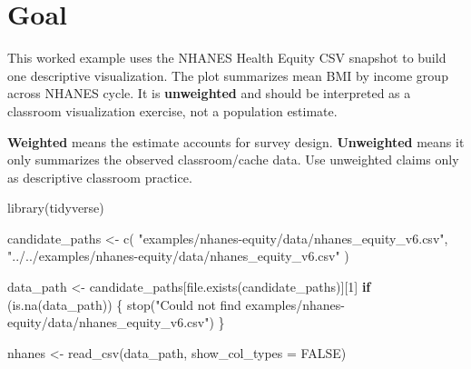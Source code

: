 \documentclass[
  letterpaper,
  DIV=11,
  numbers=noendperiod,
  oneside]{scrreprt}
\newenvironment{Shaded}{\begin{snugshade}}{\end{snugshade}}
\newcommand{\AttributeTok}[1]{\textcolor[rgb]{0.40,0.45,0.13}{#1}}
\newcommand{\ConstantTok}[1]{\textcolor[rgb]{0.56,0.35,0.01}{#1}}
\newcommand{\ControlFlowTok}[1]{\textcolor[rgb]{0.00,0.23,0.31}{\textbf{#1}}}
\newcommand{\DecValTok}[1]{\textcolor[rgb]{0.68,0.00,0.00}{#1}}
\newcommand{\FunctionTok}[1]{\textcolor[rgb]{0.28,0.35,0.67}{#1}}
\newcommand{\NormalTok}[1]{\textcolor[rgb]{0.00,0.23,0.31}{#1}}
\newcommand{\OtherTok}[1]{\textcolor[rgb]{0.00,0.23,0.31}{#1}}
\newcommand{\StringTok}[1]{\textcolor[rgb]{0.13,0.47,0.30}{#1}}
\begin{document}
\section*{Goal}\label{goal-2}


This worked example uses the NHANES Health Equity CSV snapshot to build
one descriptive visualization. The plot summarizes mean BMI by income
group across NHANES cycle. It is \textbf{unweighted} and should be
interpreted as a classroom visualization exercise, not a population
estimate.

\begin{tcolorbox}[enhanced jigsaw, title=\textcolor{quarto-callout-note-color}{\faInfo}\hspace{0.5em}{Definition: weighted vs unweighted}, arc=.35mm, toptitle=1mm, colframe=quarto-callout-note-color-frame, toprule=.15mm, leftrule=.75mm, bottomtitle=1mm, opacityback=0, bottomrule=.15mm, coltitle=black, breakable, opacitybacktitle=0.6, titlerule=0mm, colback=white, left=2mm, colbacktitle=quarto-callout-note-color!10!white, rightrule=.15mm]

\textbf{Weighted} means the estimate accounts for survey design.
\textbf{Unweighted} means it only summarizes the observed
classroom/cache data. Use unweighted claims only as descriptive
classroom practice.

\end{tcolorbox}

\begin{Shaded}
\begin{Highlighting}[numbers=left,,]
\FunctionTok{library}\NormalTok{(tidyverse)}

\NormalTok{candidate\_paths }\OtherTok{\textless{}{-}} \FunctionTok{c}\NormalTok{(}
  \StringTok{"examples/nhanes{-}equity/data/nhanes\_equity\_v6.csv"}\NormalTok{,}
  \StringTok{"../../examples/nhanes{-}equity/data/nhanes\_equity\_v6.csv"}
\NormalTok{)}

\NormalTok{data\_path }\OtherTok{\textless{}{-}}\NormalTok{ candidate\_paths[}\FunctionTok{file.exists}\NormalTok{(candidate\_paths)][}\DecValTok{1}\NormalTok{]}
\ControlFlowTok{if}\NormalTok{ (}\FunctionTok{is.na}\NormalTok{(data\_path)) \{}
  \FunctionTok{stop}\NormalTok{(}\StringTok{"Could not find examples/nhanes{-}equity/data/nhanes\_equity\_v6.csv"}\NormalTok{)}
\NormalTok{\}}

\NormalTok{nhanes }\OtherTok{\textless{}{-}} \FunctionTok{read\_csv}\NormalTok{(data\_path, }\AttributeTok{show\_col\_types =} \ConstantTok{FALSE}\NormalTok{)}
\end{Highlighting}
\end{Shaded}
\end{document}
